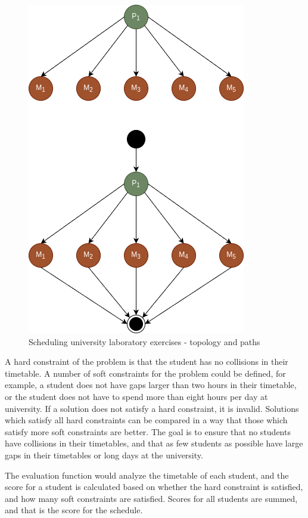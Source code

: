 \begin{figure}[!htbp]
	\centering
	\includegraphics[scale=0.6]{../images/case_study_lab.png}
	\caption{Scheduling university laboratory exercises - topology and paths}
    \label{fig:case_study_lab}
\end{figure}

A hard constraint of the problem is that the student has no collisions in their timetable. A number of soft constraints for the problem could be defined, for example, a student does not have gaps larger than two hours in their timetable, or the student does not have to spend more than eight hours per day at university. If a solution does not satisfy a hard constraint, it is invalid. Solutions which satisfy all hard constraints can be compared in a way that those which satisfy more soft constraints are better. The goal is to ensure that no students have collisions in their timetables, and that as few students as possible have large gaps in their timetables or long days at the university.

The evaluation function would analyze the timetable of each student, and the score for a student is calculated based on whether the hard constraint is satisfied, and how many soft constraints are satisfied. Scores for all students are summed, and that is the score for the schedule.

